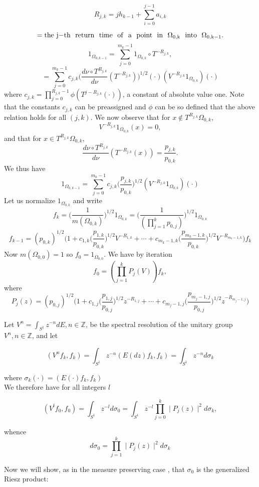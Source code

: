 \documentclass{amsart}
\theoremstyle{definition}
\theoremstyle{remark}
\numberwithin{equation}{section}
\newcommand{\1}{\mathbb{1}}
\begin{document}
$$R_{j,k} = jh_{k-1} + \sum_{i=0}^{j-1}a_{i,k}$$

$$= \rm{the}~{j-}{\rm{th}} ~~ {\rm{return ~~time ~~of ~~a ~~point ~~in}}~~\Omega_{0,k} ~~{\rm{into}}~~\Omega_{0,k-1}.$$
$$1_{\Omega_{0,k-1}} = \sum_{j=0}^{m_k-1}1_{\Omega_{0,k}}\circ T^{-R_{j,k}},$$
$$=\sum_{j=0}^{{m_k-1}}c_{j,k}\Big(\frac{d\nu\circ T^{R_{j,k}}}{d\nu}(T^{-R_{j,k}})\Big)^{1/2}(\cdot)(V^{-R_{j,k}}1_{\Omega_{0,k}})(\cdot)$$
where $ c_{j,k} =\displaystyle \prod_{j=0}^{R_{j,k}-1}\phi (T^{j-R_{j,k}}(\cdot))$, a constant of absolute value one. Note that the constants $c_{j,k}$ can be preassigned and $\phi$ can be so defined that the above relation holds for all $(j,k)$.
We now observe that for $x\notin T^{R_{j,k}}\Omega_{0,k}$,
$$V^{-R_{j,k}}1_{\Omega_{0,k}}(x) = 0,$$  and that for $x\in T^{R_{j,k}}\Omega_{0,k}$,
$$\frac{d\nu\circ T^{R_{j,k}}}{d\nu}(T^{-R_{j,k}}(x)) = \frac{p_{j,k}}{p_{0,k}}.$$
We thus have
$$1_{\Omega_{0,k-1}}  =\sum_{j=0}^{{m_k-1}}c_{j,k}\Bigg(\frac{p_{j,k}}{p_{0,k}}\Bigg)^{1/2}(V^{-R_{j,k}}1_{\Omega_{0,k}})(\cdot)$$
Let us normalize $1_{\Omega_{0,k}}$ and write
$$f_k = \Big(\frac{1}{ m(\Omega_{0,k})}\Big)^{1/2}1_{\Omega_{0,k}} = \Bigg(\frac{1}{(\prod_{j=1}^kp_{0,j})}\Bigg)^{1/2}1_{\Omega_{0,k}}$$
$$f_{k-1} = (p_{0,k})^{1/2}\Bigg(1 + c_{1,k}\Big(\frac{p_{1,k}}{p_{0,k}}\Big)^{1/2}V^{-R_{1,k}} + \cdots + c_{m_k-1,k}\Big(\frac{p_{m_k-1,k}}{p_{0,k}}\Big)^{1/2}V^{-R_{m_k-1,k}}\Bigg)f_k$$
Now $m(\Omega_{0,0}) = 1$ so $f_0 = 1_{\Omega_{0,0}}$. We have by iteration
$$f_0 = (\prod_{j=1}^kP_j(V))f_k,$$
where
$$P_j(z) = (p_{0,j})^{1/2}\Bigg(1 + c_{1,j}\Big(\frac{p_{1,j}}{p_{0,j}}\Big)^{1/2}z^{-R_{1,j}} + \cdots + c_{m_j-1,j}\Big(\frac{p_{m_j-1,j}}{p_{0,j}}\Big)^{1/2}z^{-R_{m_j-1,j}}\Bigg)$$

Let $V^n = \int_{S^1}z^{-n}dE, n \in \mathbb Z$, be the spectral resolution of the unitary group $V^n, n \in \mathbb Z$, and let

$$ (V^nf_k, f_k) = \int_{S^1}z^{-n}(E(dz)f_k,f_k) =\int_{S^1}z^{-n}d\sigma_k$$

where $\sigma_k (\cdot) = (E(\cdot)f_k, f_k)$\\

We therefore have for all integers $l$

$$(V^lf_0,f_0) = \int_{S^1}z^{-l}d\sigma_0 =\int_{S^1}z^{-l} \prod_{j=0}^k\mid P_j(z)\mid^2d\sigma_k,$$

whence
$$d\sigma_{0} = \prod_{j=1}^k\mid P_j(z)\mid^2d\sigma_k$$

Now we will show, as in the measure preserving case \cite{Nadkarni1}, that $\sigma_0$ is the generalized Riesz product:
\end{document}

